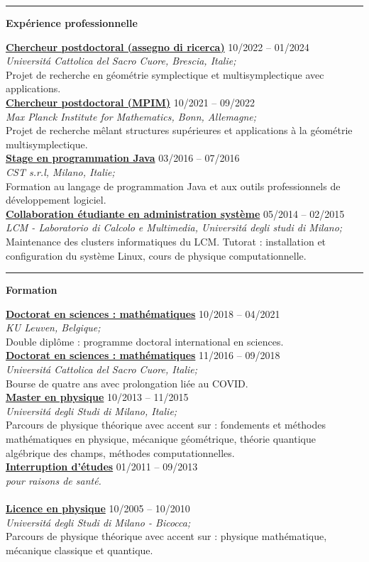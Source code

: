\documentclass[a4paper]{article}
\newcommand{\block}[1]{\hrule \vspace{0.2cm} \textbf{\Large #1} \vspace{0.2cm}}
\newcommand{\voice}[5]{\href{#4}{\textbf{#1}} \hfill #2 \\ \textit{#3} \\ {\small #5} \vspace{0.2cm} \\}
\begin{document}

	\block{Expérience professionnelle}

	\voice{Chercheur postdoctoral (assegno di ricerca)}
		{10/2022 -- 01/2024}
		{Universit\'a Cattolica del Sacro Cuore, Brescia, Italie;}
		{https://dipartimenti.unicatt.it/dmf-home}
		{Projet de recherche en géométrie symplectique et multisymplectique avec applications.}
	\voice{Chercheur postdoctoral (MPIM)}
		{10/2021 -- 09/2022}
		{Max Planck Institute for Mathematics, Bonn, Allemagne;}
		{https://www.mpim-bonn.mpg.de/}
		{Projet de recherche mêlant structures supérieures et applications à la géométrie multisymplectique.}
	\voice{Stage en programmation Java}
		{03/2016 -- 07/2016}
		{CST s.r.l, Milano, Italie;}
		{https://www.csttech.it/}
		{Formation au langage de programmation Java et aux outils professionnels de développement logiciel.}
	\voice{Collaboration étudiante en administration système}
		{05/2014 -- 02/2015}
		{LCM - Laboratorio di Calcolo e Multimedia, Universit\'a degli studi di Milano;}
		{https://lcm.mi.infn.it/}
		{Maintenance des clusters informatiques du LCM. Tutorat : installation et configuration du système Linux, cours de physique computationnelle.\vspace{-0.25cm}}

	\block{Formation}

	\voice{Doctorat en sciences : mathématiques}
		{10/2018 -- 04/2021}
		{KU Leuven, Belgique;}
		{https://web.archive.org/save/http://scuoledidottorato.unicatt.it/phdschools/science-research-projects}
		{Double diplôme : programme doctoral international en sciences.}
	\voice{Doctorat en sciences : mathématiques}
		{11/2016 -- 09/2018}
		{Universit\'a Cattolica del Sacro Cuore, Italie;}
		{https://web.archive.org/save/http://scuoledidottorato.unicatt.it/phdschools/science-research-projects}
		{Bourse de quatre ans avec prolongation liée au COVID.}
	\voice{Master en physique}
		{10/2013 -- 11/2015}
		{Universit\'a degli Studi di Milano, Italie;}
		{https://www.unimi.it/en/education/master-programme/physics-master-programme}
		{Parcours de physique théorique avec accent sur : fondements et méthodes mathématiques en physique, mécanique géométrique, théorie quantique algébrique des champs, méthodes computationnelles.}
	\voice{Interruption d'études}
		{01/2011 -- 09/2013}
		{pour raisons de santé.}
		{}
		{\vspace{-0.25cm}}
	\voice{Licence en physique}
		{10/2005 -- 10/2010}
		{Universit\'a degli Studi di Milano - Bicocca;}
		{https://www.fisica.unimib.it/en/teaching/degree-courses/bachelor-three-year-laurea-physics}
		{Parcours de physique théorique avec accent sur : physique mathématique, mécanique classique et quantique.}
\end{document}
